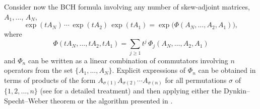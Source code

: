\documentclass[11pt]{article}
\begin{document}
Consider now the BCH formula involving any number of skew-adjoint matrices, $A_1, \ldots$, $A_N$,
\[
  \exp(t A_N) \, \cdots \, \exp(t A_2) \, \exp(t A_1) = \exp\big(\Phi(A_N, \ldots,  A_2,  A_1)\big),
\]  
where
\begin{equation} \label{bch_series_g}
  \Phi(t A_N, \ldots, t A_2, t A_1) = \sum_{j \ge 1} t^j \, \Phi_j(A_N, \ldots, A_2, A_1)
\end{equation}
and $\Phi_n$ can be written as a linear combination of commutators involving $n$ operators from the set $\{A_1, \ldots, A_N\}$.  Explicit expressions
of $\Phi_n$ can be obtained in terms of products of the form $A_{\sigma(1)} A_{\sigma(2)} \cdots A_{\sigma(n)}$ for all permutations $\sigma$ of
$\{1, 2, \ldots, n\}$ (see \cite{burgunder08eia,dynkin49otr,loday94sdh} for a detailed treatment) and then applying either the Dynkin--Specht--Weber theorem 
\cite{jacobson79la} or the algorithm presented in \cite{arnal21ano}.
\end{document}
